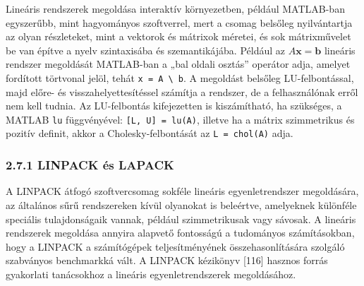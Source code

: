 \documentclass[
  magyar,
  11pt]{article}
\providecommand{\boldsymbol}[1]{\mathbf{#1}}
\begin{document}
Lineáris rendszerek megoldása interaktív környezetben, például
MATLAB-ban egyszerűbb, mint hagyományos szoftverrel, mert a csomag
belsőleg nyilvántartja az olyan részleteket, mint a vektorok és mátrixok
méretei, és sok mátrixművelet be van építve a nyelv szintaxisába és
szemantikájába. Például az \(A\boldsymbol{x} = \boldsymbol{b}\) lineáris
rendszer megoldását MATLAB-ban a „bal oldali osztás'' operátor adja,
amelyet fordított törtvonal jelöl, tehát
\texttt{x\ =\ A\ \textbackslash{}\ b}. A megoldást belsőleg
LU-felbontással, majd előre- és visszahelyettesítéssel számítja a
rendszer, de a felhasználónak erről nem kell tudnia. Az LU-felbontás
kifejezetten is kiszámítható, ha szükséges, a MATLAB \texttt{lu}
függvényével: \texttt{{[}L,\ U{]}\ =\ lu(A)}, illetve ha a mátrix
szimmetrikus és pozitív definit, akkor a Cholesky-felbontását az
\texttt{L\ =\ chol(A)} adja.

\subsubsection{2.7.1 LINPACK és LAPACK}\label{linpack-uxe9s-lapack}

A LINPACK átfogó szoftvercsomag sokféle lineáris egyenletrendszer
megoldására, az általános sűrű rendszereken kívül olyanokat is
beleértve, amelyeknek különféle speciális tulajdonságaik vannak, például
szimmetrikusak vagy sávosak. A lineáris rendszerek megoldása annyira
alapvető fontosságú a tudományos számításokban, hogy a LINPACK a
számítógépek teljesítményének összehasonlítására szolgáló szabványos
benchmarkká vált. A LINPACK kézikönyv {[}116{]} hasznos forrás
gyakorlati tanácsokhoz a lineáris egyenletrendszerek megoldásához.
\end{document}
